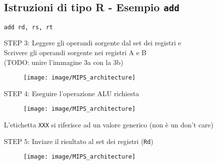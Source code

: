 \documentclass[../main.tex]{subfiles}
\begin{document}
    \newpage

    \subsection*{Istruzioni di tipo R - Esempio \texttt{add}}
    \texttt{add rd, rs, rt}
    \vspace*{1.5mm}

    \begin{adjustwidth}{1cm}{1cm}
        STEP 3: Leggere gli operandi sorgente dal set dei registri e \\
        \hspace*{1.35cm} Scrivere gli operandi sorgente
        nei registri A e B \\
        (TODO: unire l'immagine 3a con la 3b) \\

        \begin{figure}[h!]
            \centering

            \vspace*{5mm}
            \hspace*{1cm} \texttt{[image: image/MIPS\_architecture]}
            \vspace*{5mm}
        \end{figure}
    \end{adjustwidth}

    \begin{adjustwidth}{1cm}{1cm}
        STEP 4: Eseguire l'operazione ALU richiesta

        \begin{figure}[h!]
            \centering

            \vspace*{5mm}
            \hspace*{1cm} \texttt{[image: image/MIPS\_architecture]}
            \vspace*{5mm}
        \end{figure}

        \noindent
        L'etichetta \texttt{XXX} si riferisce ad un valore generico
        (non è un don't care)
    \end{adjustwidth}

    \newpage

    \begin{adjustwidth}{1cm}{1cm}
        STEP 5: Inviare il risultato al set dei registri (\texttt{Rd}) \\

        \begin{figure}[h!]
            \centering

            \vspace*{5mm}
            \hspace*{1cm} \texttt{[image: image/MIPS\_architecture]}
            \vspace*{5mm}
        \end{figure}
    \end{adjustwidth}

    \newpage
\end{document}
